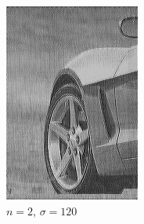 \documentclass[
	12pt, %
]{style/fphw}
\begin{document}
\begin{figure}[H]
\begin{subfigure}[b]{.22\textwidth}
             \includegraphics[width=\textwidth]{Q5_3_2_120.png}
             \caption{$n=2$, $\sigma=120$}
             \label{Q5_3_2_120}
         \end{subfigure}
     \vfill
         \begin{subfigure}[b]{.22\textwidth}
             \centering

\end{subfigure}
\end{figure}
\end{document}
